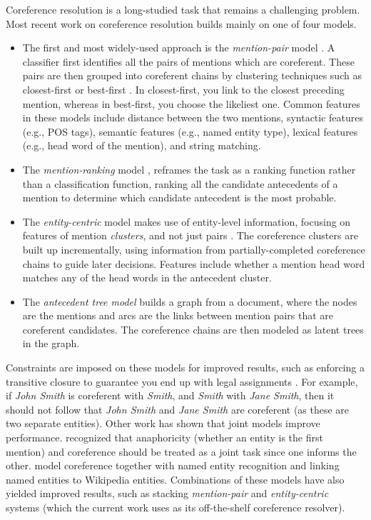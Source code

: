 Coreference resolution is a long-studied task that remains a challenging problem. Most recent work on coreference resolution builds mainly on one of four models. 
\begin{itemize}
\item The first and most widely-used approach is the \textit{mention-pair} model \cite{Soon:2001,Ng:2002}. A classifier first identifies all the pairs of mentions which are coreferent. These pairs are then grouped into coreferent chains by clustering techniques such as closest-first \cite{Soon:2001} or best-first \cite{Ng:2002,Ng:2002b}. In closest-first, you link to the closest preceding mention, whereas in best-first, you choose the likeliest one. Common features in these models include distance between the two mentions, syntactic features (e.g.,  POS tags), semantic features (e.g., named entity type), lexical features (e.g., head word of the mention), and string matching.
\item  The \textit{mention-ranking} model \cite{Denis:2008}, reframes the task as a ranking function rather than a classification function, ranking all the candidate antecedents of a mention to determine which candidate antecedent is the most probable.
\item The \textit{entity-centric} model makes use of entity-level information, focusing on features of mention \textit{clusters}, and not just pairs \cite{Raghunathan:2010}. The coreference clusters are built up incrementally, using information from  partially-completed coreference chains to guide later decisions. Features include whether a mention head word matches any of the head words in the antecedent cluster.
 \item The \textit{antecedent tree model} \cite{Yu:2009} builds a graph from a document, where the nodes are the mentions and arcs are the links between mention pairs that are coreferent candidates. The coreference chains are then modeled as latent trees in the graph.
\end{itemize}
Constraints are imposed on these models for improved results, such as enforcing a transitive closure to guarantee you end up with legal assignments \cite{Finkel:2008}. For example, if \textit{John Smith} is coreferent with \textit{Smith}, and \textit{Smith} with \textit{Jane Smith}, then it should not follow that \textit{John Smith} and \textit{Jane Smith} are coreferent (as these are two separate entities). Other work has shown that joint models improve performance.  recognized that anaphoricity (whether an entity is the first mention) and coreference should be treated as a joint task since one informs the other.  model coreference together with named entity recognition and linking named entities to Wikipedia entities. Combinations of these models have also yielded improved results, such as  stacking \textit{mention-pair} and \textit{entity-centric} systems (which the current work uses as its off-the-shelf coreference resolver).

